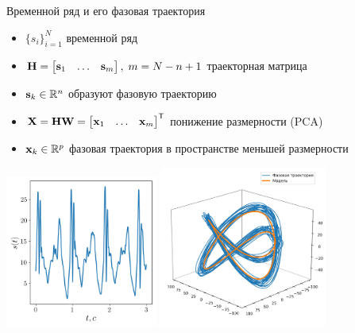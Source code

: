 \documentclass{beamer}
\begin{document}
\begin{frame}{Временной ряд и его фазовая траектория}
\begin{itemize}
\item[\textbullet] $\{ s_i \}_{i = 1}^N$\; временной ряд\\

\item[\textbullet] $\mbox{\bfseries H} = \begin{bmatrix} \mbox{\bfseries s}_1 & \dots & \mbox{\bfseries s}_{m} \end{bmatrix} ,\;m = N - n + 1$\;  траекторная матрица\\

\item[\textbullet] $\mbox{\bfseries s}_k\in\mathbb{R}^n$\; образуют фазовую траекторию\\

\item[\textbullet] $\mbox{\bfseries X} = \mbox{\bfseries H} \mbox{\bfseries W} = \begin{bmatrix} \mbox{\bfseries x}_1 & \dots & \mbox{\bfseries x}_{m} \end{bmatrix} ^{\mathsf{T}}$\; понижение размерности (PCA) 
\item[\textbullet] $\mbox{\bfseries x}_k\in\mathbb{R}^p$\; фазовая траектория в пространстве меньшей размерности
\end{itemize}
\hfil\hfil\includegraphics[width=5cm]{ts_slide}
\hfil\hfil\includegraphics[width=5.5cm]{st2}
\newline
\end{frame}
\end{document}
